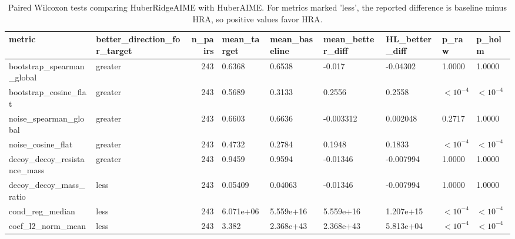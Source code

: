 \begin{table}[t]
\centering
\begin{tabular}{llrllllll}
\toprule
metric & better_direction_for_target & n_pairs & mean_target & mean_baseline & mean_better_diff & HL_better_diff & p_raw & p_holm \\
\midrule
bootstrap_spearman_global & greater & 243 & 0.6368 & 0.6538 & -0.017 & -0.04302 & 1.0000 & 1.0000 \\
bootstrap_cosine_flat & greater & 243 & 0.5689 & 0.3133 & 0.2556 & 0.2558 & $<10^{-4}$ & $<10^{-4}$ \\
noise_spearman_global & greater & 243 & 0.6603 & 0.6636 & -0.003312 & 0.002048 & 0.2717 & 1.0000 \\
noise_cosine_flat & greater & 243 & 0.4732 & 0.2784 & 0.1948 & 0.1833 & $<10^{-4}$ & $<10^{-4}$ \\
decoy_decoy_resistance_mass & greater & 243 & 0.9459 & 0.9594 & -0.01346 & -0.007994 & 1.0000 & 1.0000 \\
decoy_decoy_mass_ratio & less & 243 & 0.05409 & 0.04063 & -0.01346 & -0.007994 & 1.0000 & 1.0000 \\
cond_reg_median & less & 243 & 6.071e+06 & 5.559e+16 & 5.559e+16 & 1.207e+15 & $<10^{-4}$ & $<10^{-4}$ \\
coef_l2_norm_mean & less & 243 & 3.382 & 2.368e+43 & 2.368e+43 & 5.813e+04 & $<10^{-4}$ & $<10^{-4}$ \\
\bottomrule
\end{tabular}

\caption{Paired Wilcoxon tests comparing HuberRidgeAIME with HuberAIME. For metrics marked 'less', the reported difference is baseline minus HRA, so positive values favor HRA.}
\label{tab:revision_paired_hra_huberaime_all}
\end{table}